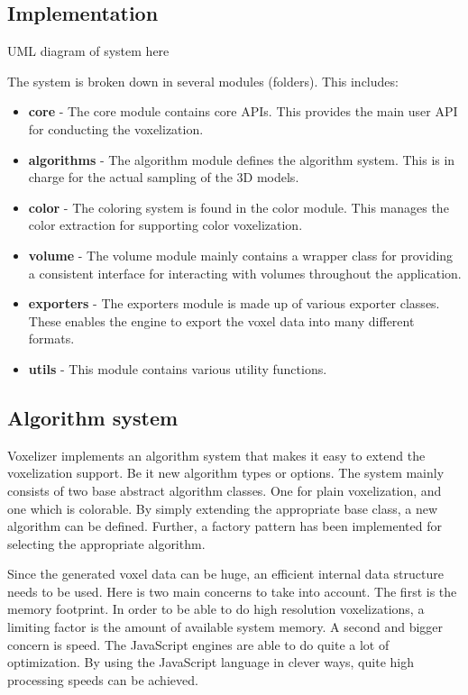 \subsection{Implementation}
\label{sec:method-implementation}
\colorbox{RubineRed}{UML diagram of system here}

The system is broken down in several modules (folders). This includes:
\begin{itemize}
    \item \textbf{core} - The core module contains core APIs. This provides the main user API for conducting the voxelization.
    \item \textbf{algorithms} - The algorithm module defines the algorithm system. This is in charge for the actual sampling of the 3D models.
    \item \textbf{color} - The coloring system is found in the color module. This manages the color extraction for supporting color voxelization.
    \item \textbf{volume} - The volume module mainly contains a wrapper class for providing a consistent interface for interacting with volumes throughout the application.  
    \item \textbf{exporters} - The exporters module is made up of various exporter classes. These enables the engine to export the voxel data into many different formats.
    \item \textbf{utils} - This module contains various utility functions.
\end{itemize}

\subsection{Algorithm system}
Voxelizer implements an algorithm system that makes it easy to extend the voxelization support. Be it new algorithm types or options. The system mainly consists of two base abstract algorithm classes. One for plain voxelization, and one which is colorable. By simply extending the appropriate base class, a new algorithm can be defined. Further, a factory pattern has been implemented for selecting the appropriate algorithm.

Since the generated voxel data can be huge, an efficient internal data structure needs to be used. Here is two main concerns to take into account. The first is the memory footprint. In order to be able to do high resolution voxelizations, a limiting factor is the amount of available system memory. A second and bigger concern is speed. The JavaScript engines are able to do quite a lot of optimization. By using the JavaScript language in clever ways, quite high processing speeds can be achieved.


